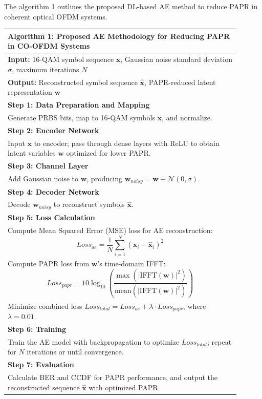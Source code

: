 \documentclass[conference]{IEEEtran}
\begin{document}
The algorithm 1 outlines the proposed DL-based AE method to reduce PAPR in coherent optical OFDM systems. 

\begin{table}[htbp]
\centering
\begin{tabular}{p{0.9\linewidth}}
\hline
\textbf{Algorithm 1:} Proposed AE Methodology for Reducing PAPR in CO-OFDM Systems \\
\hline
\textbf{Input:} 16-QAM symbol sequence $\mathbf{x}$, Gaussian noise standard deviation $\sigma$, maximum iterations $N$ \\
\textbf{Output:} Reconstructed symbol sequence $\mathbf{\hat{x}}$, PAPR-reduced latent representation $\mathbf{w}$ \\
\textbf{Step 1: Data Preparation and Mapping} \\
Generate PRBS bits, map to 16-QAM symbols $\mathbf{x}$, and normalize. \\
\textbf{Step 2: Encoder Network} \\
Input $\mathbf{x}$ to encoder; pass through dense layers with ReLU to obtain latent variables $\mathbf{w}$ optimized for lower PAPR. \\
\textbf{Step 3: Channel Layer} \\
Add Gaussian noise to $\mathbf{w}$, producing $\mathbf{w}_{noisy} = \mathbf{w} + \mathcal{N}(0, \sigma)$. \\
\textbf{Step 4: Decoder Network} \\
Decode $\mathbf{w}_{noisy}$ to reconstruct symbols $\mathbf{\hat{x}}$. \\
\textbf{Step 5: Loss Calculation} \\
Compute Mean Squared Error (MSE) loss for AE reconstruction:
\begin{equation*}
Loss_{ae} = \frac{1}{N} \sum_{i=1}^{N} (\mathbf{x}_i - \mathbf{\hat{x}}_i)^2
\end{equation*} \\
Compute PAPR loss from $\mathbf{w}$'s time-domain IFFT:
\begin{equation*}
Loss_{papr} = 10 \log_{10} \left( \frac{\max(|\text{IFFT}(\mathbf{w})|^2)}{\text{mean}(|\text{IFFT}(\mathbf{w})|^2)} \right)
\end{equation*} \\
Minimize combined loss $Loss_{total} = Loss_{ae} + \lambda \cdot Loss_{papr}$, where $\lambda = 0.01$ \\
\textbf{Step 6: Training} \\
Train the AE model with backpropagation to optimize $Loss_{total}$; repeat for $N$ iterations or until convergence. \\
\textbf{Step 7: Evaluation} \\
Calculate BER and CCDF for PAPR performance, and output the reconstructed sequence $\mathbf{\hat{x}}$ with optimized PAPR. \\
\hline
\end{tabular}
\end{table}
\end{document}

